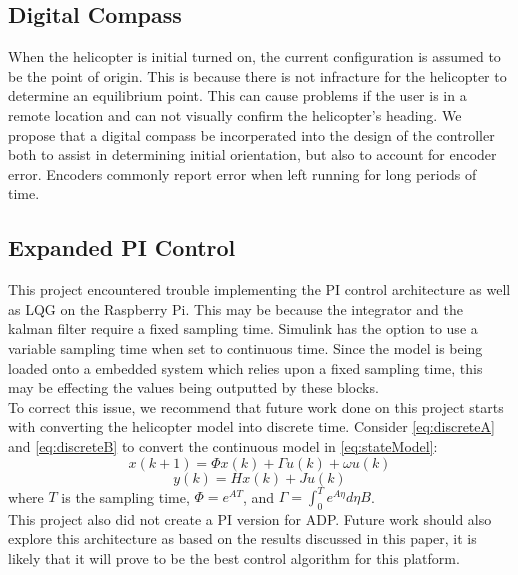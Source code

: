\subsection{Digital Compass}
When the helicopter is initial turned on, the current configuration is assumed to be the point of origin.  This is because there is not infracture for the helicopter to determine an equilibrium point.  This can cause problems if the user is in a remote location and can not visually confirm the helicopter's heading.  We propose that a digital compass be incorperated into the design of the controller both to assist in determining initial orientation, but also to account for encoder error.  Encoders commonly report error when left running for long periods of time.

\subsection{Expanded PI Control}
This project encountered trouble implementing the PI control architecture as well as LQG on the Raspberry Pi. This may be because the integrator and the kalman filter require a fixed sampling time.  Simulink has the option to use a variable sampling time when set to continuous time.  Since the model is being loaded onto a embedded system which relies upon a fixed sampling time, this may be effecting the values being outputted by these blocks.\\
To correct this issue, we recommend that future work done on this project starts with converting the helicopter model into discrete time.  Consider \ref{eq:discreteA} and \ref{eq:discreteB} to convert the continuous model in \ref{eq:stateModel}:
\begin{equation}
\label{eq:discreteA}
    x(k+1)=\Phi x(k)+\Gamma u(k)+\omega u(k)
\end{equation}
\begin{equation}
\label{eq:discreteB}
    y(k)=Hx(k)+Ju(k)
\end{equation}
where $T$ is the sampling time, $\Phi=e^{AT}$, and $\Gamma=\int_0^T e^{A\eta} d\eta B$.\\
This project also did not create a PI version for ADP.  Future work should also explore this architecture as based on the results discussed in this paper, it is likely that it will prove to be the best control algorithm for this platform.




